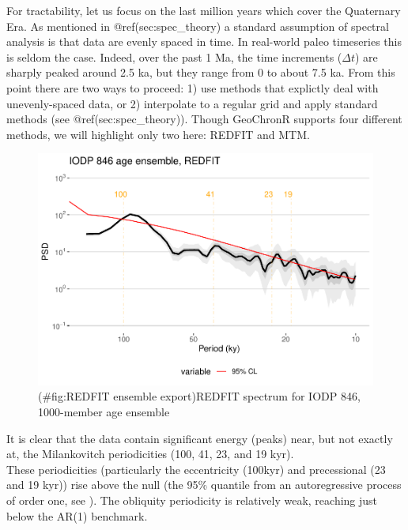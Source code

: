 \documentclass[gc, manuscript]{copernicus}
\begin{document}
For tractability, let us focus on the last million years which cover the Quaternary Era.
As mentioned in @ref(sec:spec\_theory) a standard assumption of spectral analysis is that data are evenly spaced in time.
In real-world paleo timeseries this is seldom the case.
Indeed, over the past 1 Ma, the time increments (\(\Delta t\)) are sharply peaked around 2.5 ka, but they range from 0 to about 7.5 ka.
From this point there are two ways to proceed: 1) use methods that explictly deal with unevenly-spaced data, or 2) interpolate to a regular grid and apply standard methods (see @ref(sec:spec\_theory)).
Though GeoChronR supports four different methods, we will highlight only two here: REDFIT and MTM.

\begin{figure}
\centering
\includegraphics{geoChronR-paper_files/figure-latex/REDFIT ensemble export-1.pdf}
\caption{(\#fig:REDFIT ensemble export)REDFIT spectrum for IODP 846, 1000-member age ensemble}
\end{figure}

It is clear that the data contain significant energy (peaks) near, but not exactly at, the Milankovitch periodicities (100, 41, 23, and 19 kyr).\\
These periodicities (particularly the eccentricity (100kyr) and precessional (23 and 19 kyr)) rise above the null (the 95\% quantile from an autoregressive process of order one, see \citet{Mudelsee_NPG09}).
The obliquity periodicity is relatively weak, reaching just below the AR(1) benchmark.
\end{document}
